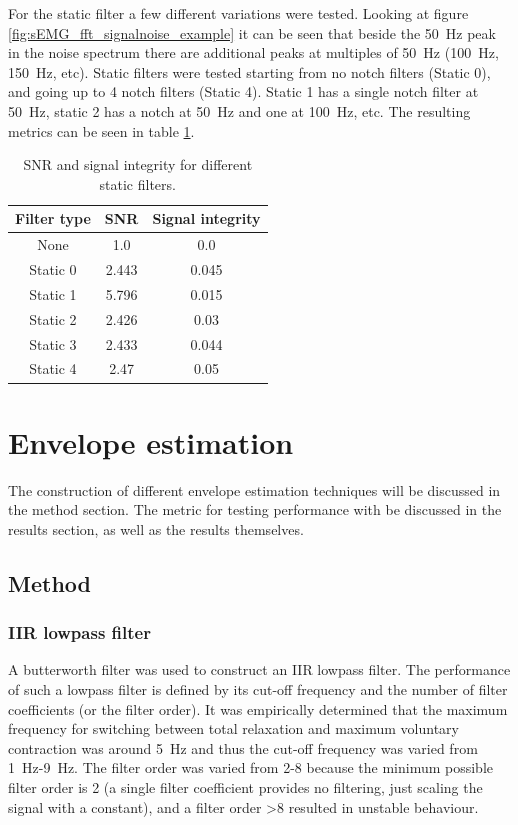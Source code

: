For the static filter a few different variations were tested. Looking at figure \ref{fig:sEMG_fft_signalnoise_example} it can be seen that beside the \SI{50}{\hertz} peak in the noise spectrum there are additional peaks at multiples of \SI{50}{\hertz} (\SI{100}{\hertz}, \SI{150}{\hertz}, etc). Static filters were tested starting from no notch filters (Static 0), and going up to 4 notch filters (Static 4). Static 1 has a single notch filter at \SI{50}{\hertz}, static 2 has a notch at \SI{50}{\hertz} and one at \SI{100}{\hertz}, etc. The resulting metrics can be seen in table \ref{tab:static_filter_snr_integrity}.

\begin{table} [h!]
    \begin{tabular}{c|c|c}
        Filter type & SNR & Signal integrity\\
        \hline
        None & 1.0 & 0.0\\
        Static 0 & 2.443 & 0.045\\
        Static 1 & 5.796 & 0.015\\
        Static 2 & 2.426 & 0.03\\
        Static 3 & 2.433 & 0.044\\
        Static 4 & 2.47 & 0.05\\
    \end{tabular}
    \caption{SNR and signal integrity for different static filters.}
    \label{tab:static_filter_snr_integrity}
\end{table}

\section{Envelope estimation}
The construction of different envelope estimation techniques will be discussed in the method section. The metric for testing performance with be discussed in the results section, as well as the results themselves.

\subsection{Method}
\subsubsection{IIR lowpass filter}
A butterworth filter was used to construct an IIR lowpass filter. The performance of such a lowpass filter is defined by its cut-off frequency and the number of filter coefficients (or the filter order). It was empirically determined that the maximum frequency for switching between total relaxation and maximum voluntary contraction was around \SI{5}{\hertz} and thus the cut-off frequency was varied from \SI{1}{\hertz}-\SI{9}{\hertz}. The filter order was varied from 2-8 because the minimum possible filter order is 2 (a single filter coefficient provides no filtering, just scaling the signal with a constant), and a filter order >8 resulted in unstable behaviour.

